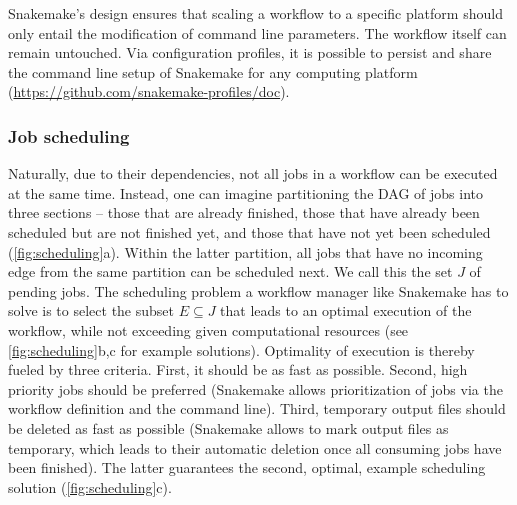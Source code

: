 \documentclass[parskip=half]{scrartcl}
\let\plainurl\url
\renewcommand{\url}[1]{\protect\plainurl{#1}}
\begin{document}
Snakemake's design ensures that scaling a workflow to a specific platform should only entail the modification of command line parameters.
The workflow itself can remain untouched.
Via configuration profiles, it is possible to persist and share the command line setup of Snakemake for any computing platform (\url{https://github.com/snakemake-profiles/doc}).

\subsubsection{Job scheduling}\label{sec:scheduling}

Naturally, due to their dependencies, not all jobs in a workflow can be executed at the same time.
Instead, one can imagine partitioning the DAG of jobs into three sections -- those that are already finished, those that have already been scheduled but are not finished yet, and those that have not yet been scheduled (\autoref{fig:scheduling}a).
Within the latter partition, all jobs that have no incoming edge from the same partition can be scheduled next.
We call this the set $J$ of pending jobs.
The scheduling problem a workflow manager like Snakemake has to solve is to select the subset $E \subseteq J$ that leads to an optimal execution of the workflow, while not exceeding given computational resources (see \autoref{fig:scheduling}b,c for example solutions).
Optimality of execution is thereby fueled by three criteria.
First, it should be as fast as possible.
Second, high priority jobs should be preferred (Snakemake allows prioritization of jobs via the workflow definition and the command line).
Third, temporary output files should be deleted as fast as possible (Snakemake allows to mark output files as temporary, which leads to their automatic deletion once all consuming jobs have been finished).
The latter guarantees the second, optimal, example scheduling solution (\autoref{fig:scheduling}c).
\end{document}
